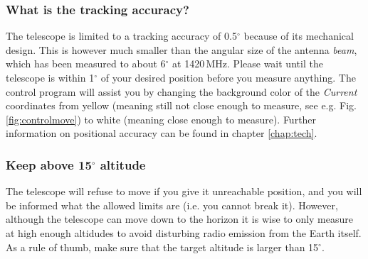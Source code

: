 \subsubsection{What is the tracking accuracy?}
The telescope is limited to a tracking accuracy of 0.5$^\circ$
because of its mechanical design. This is however much smaller than the angular
size of the antenna \emph{beam}, which has been measured to about 6$^\circ$
at 1420\,MHz.  Please wait until the telescope is within 1$^\circ$ of your
desired position before you measure anything.  The control program will assist
you by changing the background color of the \emph{Current} coordinates from
yellow (meaning still not close enough to measure, see e.g. Fig.
\ref{fig:controlmove}) to white (meaning close enough to measure).  Further
information on positional accuracy can be found in chapter \ref{chap:tech}.

\subsubsection{Keep above 15$^\circ$ altitude}
The telescope will refuse to move if you give it unreachable position, and you
will be informed what the allowed limits are (i.e. you cannot break it).
However, although the telescope can move down to the horizon it is wise to only
measure at high enough altidudes to avoid disturbing radio emission from the
Earth itself.  As a rule of thumb, make sure that the target altitude is larger
than 15$^\circ$.

